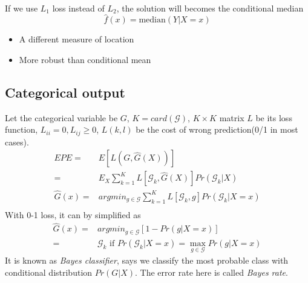 ~

If we use $L_1$ loss instead of $L_2$, the solution will becomes the conditional median
\begin{equation*}
	\hat{f}(x)=\text{median}(Y|X=x)
\end{equation*}
\begin{itemize}
	\item A different measure of location
	\item More robust than conditional mean
\end{itemize}

\subsection{Categorical output}
Let the categorical variable be $G$, $K=card(\mathcal{G})$, $K\times K$ matrix $L$ be its loss function, $L_{ii}=0, L_{ij}\ge0$, $L(k,l)$ be the cost of wrong prediction(0/1 in most cases). 
\begin{align*}
	EPE=&E[L(G, \hat{G}(X))]\\
	=&E_X\sum_{k=1}^{K}L[\mathcal{G}_k, \hat{G}(X)]Pr(\mathcal{G}_k|X)\\
	\hat{G}(x)=&argmin_{g\in\mathcal{G}}\sum_{k=1}^{K}L[\mathcal{G}_k, g]Pr(\mathcal{G}_k|X=x)\\
\end{align*}
With 0-1 loss, it can by simplified as
\begin{align*}
	\hat{G}(x)=&argmin_{g\in\mathcal{G}}[1-Pr(g|X=x)]\\
	=&\mathcal{G}_k \text{ if } Pr(\mathcal{G}_k|X=x)=\max_{g\in\mathcal{G}}Pr(g|X=x)	
\end{align*}
It is known as \textit{Bayes classifier}, says we classify the most probable class with conditional distribution $Pr(G|X)$. The error rate here is called \textit{Bayes rate}. 

